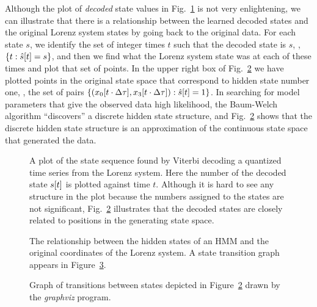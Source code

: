  Although the plot of \emph{decoded} 
 state values in Fig.~\ref{fig:STSintro} is not very enlightening, we
 can illustrate that there is a relationship between the learned
 decoded states and the original Lorenz system states by going back to
 the original data.  For each state $s$, we identify the set of
 integer times $t$ such that the decoded state is $s$, \ie, $\left\{ t
   :{\hat s}{[t]} = s \right\}$, and then we find what the Lorenz
 system state was at each of these times and plot that set of points.
 In the upper right box of Fig.~\ref{fig:Statesintro} we have plotted
 points in the original state space that correspond to hidden state
 number one, \ie, the set of pairs $\left\{
   ({x_0}{[t\cdot\Delta\tau]},{x_3}{[t\cdot\Delta\tau]}) :{\hat
     s}{[t]} = 1 \right\}$.  In searching for model parameters that give
 the observed data high likelihood, the Baum-Welch algorithm
 ``discovers'' a discrete hidden state structure, and
 Fig.~\ref{fig:Statesintro} shows that the discrete hidden state
 structure is an approximation of the continuous state space that
 generated the data.
 \begin{figure}[htbp]
   \caption[A plot of a state sequence found by Viterbi decoding.]%
   {A plot of the state sequence found by Viterbi decoding a quantized
     time series from the Lorenz system.  Here the number of the
     decoded state ${s}{[t]}$ is plotted against time $t$.  Although
     it is hard to see any structure in the plot because the numbers
     assigned to the states are not significant,
     Fig.~\ref{fig:Statesintro} illustrates that the decoded states
     are closely related to positions in the generating state space.}
   \label{fig:STSintro}
 \end{figure}

 \begin{figure}[p]
   \caption[Relationship between states of HMM and Lorenz system.]%
   {The relationship between the hidden states of an HMM and the
     original coordinates of the Lorenz system.  A state transition
     graph appears in Figure~\ref{fig:GraphStates}.}
   \label{fig:Statesintro}
 \end{figure}

 \begin{figure}[p]
   \caption[Graph of transitions between
   states.]%
   {Graph of transitions between states depicted in
     Figure~\ref{fig:Statesintro} drawn by the \emph{graphviz}
     program.}
   \label{fig:GraphStates}
 \end{figure}


